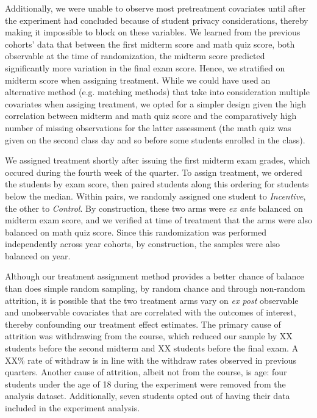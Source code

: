 \documentclass[12pt]{article}
\begin{document}
Additionally, we were unable to observe most pretreatment covariates until after the experiment had concluded because of student privacy considerations, thereby making it impossible to block on these variables. We learned from the previous cohorts' data that between the first midterm score and math quiz score, both observable at the time of randomization, the midterm score predicted significantly more variation in the final exam score. Hence, we stratified on midterm score when assigning treatment. While we could have used an alternative method (e.g. matching methods) that take into consideration multiple covariates when assiging treatment, we opted for a simpler design given the high correlation between midterm and math quiz score and the comparatively high number of missing observations for the latter assessment (the math quiz was given on the second class day and so before some students enrolled in the class).

We assigned treatment shortly after issuing the first midterm exam grades, which occured during the fourth week of the quarter. To assign treatment, we ordered the students by exam score, then paired students along this ordering for students below the median. Within pairs, we randomly assigned one student to \textit{Incentive}, the other to \textit{Control}. By construction, these two arms were \textit{ex ante} balanced on midterm exam score, and we verified at time of treatment that the arms were also balanced on math quiz score. Since this randomization was performed independently across year cohorts, by construction, the samples were also balanced on year.

Although our treatment assignment method provides a better chance of balance than does simple random sampling, by random chance and through non-random attrition, it is possible that the two treatment arms vary on \textit{ex post} observable and unobservable covariates that are correlated with the outcomes of interest, thereby confounding our treatment effect estimates. The primary cause of attrition was withdrawing from the course, which reduced our sample by XX students before the second midterm and XX students before the final exam. A XX\% rate of withdraw is in line with the withdraw rates observed in previous quarters. Another cause of attrition, albeit not from the course, is age: four students under the age of 18 during the experiment were removed from the analysis dataset. Additionally, seven students opted out of having their data included in the experiment analysis.
\end{document}
